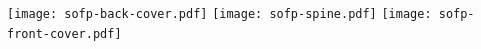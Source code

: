 \documentclass[border=0pt]{standalone}
\begin{document}
  \texttt{[image: sofp-back-cover.pdf]}%
  \texttt{[image: sofp-spine.pdf]}
  \texttt{[image: sofp-front-cover.pdf]}%
\end{document}
